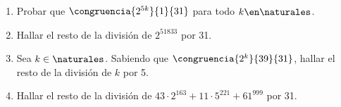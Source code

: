 \begin{enunciado}{\ejercicio}

  \begin{enumerate}[label=(\alph*)]

    \item Probar que  $\congruencia{2^{5k}}{1}{31}$ para todo $k \en \naturales$.

    \item Hallar el resto de la división de $2^{51833}$ por 31.

    \item Sea $k \in \naturales$. Sabiendo que $\congruencia{2^k}{39}{31}$, hallar el resto de la división de $k$ por 5.

    \item Hallar el resto de la división de $43 \cdot 2^{163} + 11 \cdot 5^{221} + 61^{999}$ por 31.

  \end{enumerate}

\end{enunciado}

